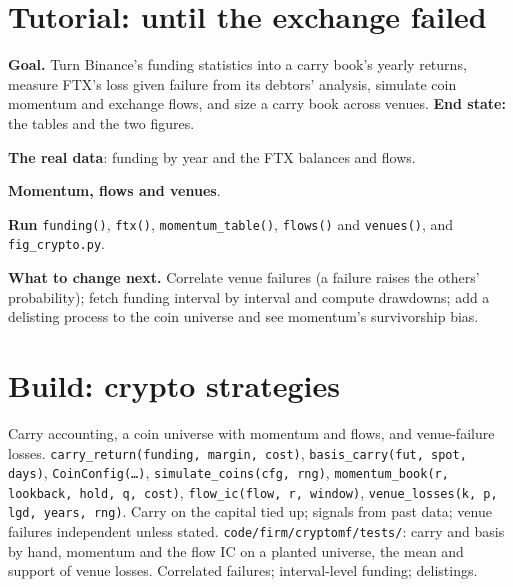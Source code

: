\section{Tutorial: until the exchange failed}\label{tut:s1:crypto-medium-frequency-strategies:tut}

\begin{tutorial}
\textbf{Goal.} Turn Binance's funding statistics into a carry book's yearly returns, measure FTX's loss given failure from its debtors' analysis,
simulate coin momentum and exchange flows, and size a carry book across venues. \textbf{End state:} the tables and the two figures.
\begin{tutsteps}
\item \textbf{The real data}: funding by year and the FTX balances and flows.
\label{lst:s1:crypto-medium-frequency-strategies:data}
\item \textbf{Momentum, flows and venues}.
\label{lst:s1:crypto-medium-frequency-strategies:venues}
\item \textbf{Run} \texttt{funding()}, \texttt{ftx()}, \texttt{momentum\_table()}, \texttt{flows()} and \texttt{venues()}, and \texttt{fig\_crypto.py}.
\end{tutsteps}
\textbf{What to change next.} Correlate venue failures (a failure raises the others' probability); fetch funding interval by interval and compute
drawdowns; add a delisting process to the coin universe and see momentum's survivorship bias.
\end{tutorial}

\section{Build: crypto strategies}\label{bld:s1:crypto-medium-frequency-strategies:cryptomf}

\begin{build}
 Carry accounting, a coin universe with momentum and flows, and venue-failure losses.
 \texttt{carry\_return(funding, margin, cost)}, \texttt{basis\_carry(fut, spot, days)}, \texttt{CoinConfig(\dots)},
\texttt{simulate\_coins(cfg, rng)}, \texttt{momentum\_book(r, lookback, hold, q, cost)}, \texttt{flow\_ic(flow, r, window)}, \texttt{venue\_losses(k,
p, lgd, years, rng)}.
 Carry on the capital tied up; signals from past data; venue failures independent unless stated.
 \texttt{code/firm/cryptomf/tests/}: carry and basis by hand, momentum and the flow IC on a planted universe, the mean and support
of venue losses.
 Correlated failures; interval-level funding; delistings.
\end{build}

